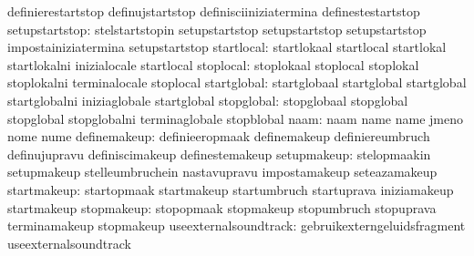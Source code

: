                                   definierestartstop               definujstartstop
                                  definisciiniziatermina           definestestartstop
                  setupstartstop: stelstartstopin                  setupstartstop
                                  setupstartstop                   setupstartstop
                                  impostainiziatermina             setupstartstop
                      startlocal: startlokaal                      startlocal
                                  startlokal                       startlokalni
                                  inizialocale                     startlocal
                       stoplocal: stoplokaal                       stoplocal
                                  stoplokal                        stoplokalni
                                  terminalocale                    stoplocal
                     startglobal: startglobaal                     startglobal
                                  startglobal                      startglobalni
                                  iniziaglobale                    startglobal
                      stopglobal: stopglobaal                      stopglobal
                                  stopglobal                       stopglobalni
                                  terminaglobale                   stopblobal
                            naam: naam                             name
                                  name                             jmeno
                                  nome                             nume
                    definemakeup: definieeropmaak                  definemakeup
                                  definiereumbruch                 definujupravu
                                  definiscimakeup                  definestemakeup %
                     setupmakeup: stelopmaakin                     setupmakeup
                                  stelleumbruchein                 nastavupravu
                                  impostamakeup                    seteazamakeup
                     startmakeup: startopmaak                      startmakeup
                                  startumbruch                     startuprava
                                  iniziamakeup                     startmakeup
                      stopmakeup: stopopmaak                       stopmakeup
                                  stopumbruch                      stopuprava
                                  terminamakeup                    stopmakeup
           useexternalsoundtrack: gebruikexterngeluidsfragment     useexternalsoundtrack
